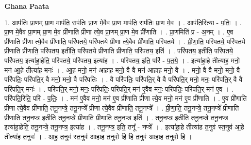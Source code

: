 \documentclass[17pt]{extarticle}
\begin{document}
\textbf{Ghana Paata } \newline

1. आप॑तिः प्रा॒णम् प्रा॒ण माप॑ति॒ राप॑तिः प्रा॒ण मे॒वैव प्रा॒ण माप॑ति॒ राप॑तिः प्रा॒ण मे॒व । . आप॑ति॒रित्या - प॒तिः॒ । . प्रा॒ण मे॒वैव प्रा॒णम् प्रा॒ण मे॒व प्री॑णाति प्रीणा त्ये॒व प्रा॒णम् प्रा॒ण मे॒व प्री॑णाति । . प्रा॒णमिति॑ प्र - अ॒नम् । . ए॒व प्री॑णाति प्रीणा त्ये॒वैव प्री॑णाति॒ परि॑पतये॒ परि॑पतये प्रीणा त्ये॒वैव प्री॑णाति॒ परि॑पतये । . प्री॒णा॒ति॒ परि॑पतये॒ परि॑पतये प्रीणाति प्रीणाति॒ परि॑पतय॒ इतीति॒ परि॑पतये प्रीणाति प्रीणाति॒ परि॑पतय॒ इति॑ । . परि॑पतय॒ इतीति॒ परि॑पतये॒ परि॑पतय॒ इत्या॑हा॒हेति॒ परि॑पतये॒ परि॑पतय॒ इत्या॑ह । . परि॑पतय॒ इति॒ परि॑ - प॒त॒ये॒ । . इत्या॑हा॒हे तीत्या॑ह॒ मनो॒ मन॑ आ॒हे तीत्या॑ह॒ मनः॑ । . आ॒ह॒ मनो॒ मन॑ आहाह॒ मनो॒ वै वै मन॑ आहाह॒ मनो॒ वै । . मनो॒ वै वै मनो॒ मनो॒ वै परि॑पतिः॒ परि॑पति॒र् वै मनो॒ मनो॒ वै परि॑पतिः । . वै परि॑पतिः॒ परि॑पति॒र् वै वै परि॑पति॒र् मनो॒ मनः॒ परि॑पति॒र् वै वै परि॑पति॒र् मनः॑ । . परि॑पति॒र् मनो॒ मनः॒ परि॑पतिः॒ परि॑पति॒र् मन॑ ए॒वैव मनः॒ परि॑पतिः॒ परि॑पति॒र् मन॑ ए॒व । . परि॑पति॒रिति॒ परि॑ - प॒तिः॒ । . मन॑ ए॒वैव मनो॒ मन॑ ए॒व प्री॑णाति प्रीणा त्ये॒व मनो॒ मन॑ ए॒व प्री॑णाति । . ए॒व प्री॑णाति प्रीणा त्ये॒वैव प्री॑णाति॒ तनू॒नप्त्रे॒ तनू॒नप्त्रे᳚ प्रीणा त्ये॒वैव प्री॑णाति॒ तनू॒नप्त्रे᳚ । . प्री॒णा॒ति॒ तनू॒नप्त्रे॒ तनू॒नप्त्रे᳚ प्रीणाति प्रीणाति॒ तनू॒नप्त्र॒ इतीति॒ तनू॒नप्त्रे᳚ प्रीणाति प्रीणाति॒ तनू॒नप्त्र॒ इति॑ । . तनू॒नप्त्र॒ इतीति॒ तनू॒नप्त्रे॒ तनू॒नप्त्र॒ इत्या॑हा॒हेति॒ तनू॒नप्त्रे॒ तनू॒नप्त्र॒ इत्या॑ह । . तनू॒नप्त्र॒ इति॒ तनू᳚ - नप्त्रे᳚ । . इत्या॑हा॒हे तीत्या॑ह त॒नुव॑ स्त॒नुव॑ आ॒हे तीत्या॑ह त॒नुवः॑ । . आ॒ह॒ त॒नुव॑ स्त॒नुव॑ आहाह त॒नुवो॒ हि हि त॒नुव॑ आहाह त॒नुवो॒ हि । \newline
\end{document}
